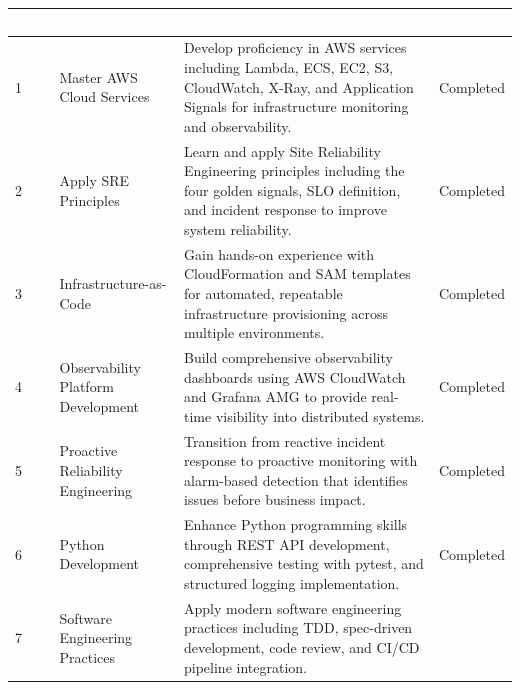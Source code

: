 \vspace{0.5em}
\label{tab:learning_goals_eval}
\begin{tabularx}{\textwidth}{@{\hspace{\tabcolsep}}>{\centering\arraybackslash}p{}>{\raggedright\arraybackslash}p{}>{\raggedright\arraybackslash}X>{\centering\arraybackslash}p{}@{\hspace{\tabcolsep}}}
\hline
\rowcolor{smubrand}
  \textcolor{white}{\textbf{S.N.}} &
  \textcolor{white}{\textbf{Task}} &
  \textcolor{white}{\textbf{Description}} &
  \textcolor{white}{\textbf{Status}} \\
\hline
\rowcolor{tablerowA} 1 & Master AWS Cloud Services &
  Develop proficiency in AWS services including Lambda, ECS, EC2, S3, CloudWatch, X-Ray, and Application Signals for infrastructure monitoring and observability. &
  \cellcolor{statusgreen}Completed \\
\rowcolor{tablerowB} 2 & Apply SRE Principles &
  Learn and apply Site Reliability Engineering principles including the four golden signals, SLO definition, and incident response to improve system reliability. &
  \cellcolor{statusgreen}Completed \\
\rowcolor{tablerowA} 3 & Infrastructure-as-Code &
  Gain hands-on experience with CloudFormation and SAM templates for automated, repeatable infrastructure provisioning across multiple environments. &
  \cellcolor{statusgreen}Completed \\
\rowcolor{tablerowB} 4 & Observability Platform Development &
  Build comprehensive observability dashboards using AWS CloudWatch and Grafana AMG to provide real-time visibility into distributed systems. &
  \cellcolor{statusgreen}Completed \\
\rowcolor{tablerowA} 5 & Proactive Reliability Engineering &
  Transition from reactive incident response to proactive monitoring with alarm-based detection that identifies issues before business impact. &
  \cellcolor{statusgreen}Completed \\
\rowcolor{tablerowB} 6 & Python Development &
  Enhance Python programming skills through REST API development, comprehensive testing with pytest, and structured logging implementation. &
  \cellcolor{statusgreen}Completed \\
\rowcolor{tablerowA} 7 & Software Engineering Practices &
  Apply modern software engineering practices including TDD, spec-driven development, code review, and CI/CD pipeline integration. &

\end{tabularx}
